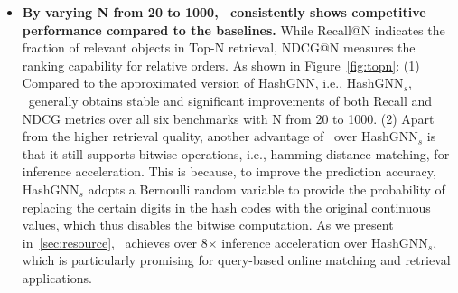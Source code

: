 \begin{itemize}[leftmargin=*]
\item \textbf{By varying N from 20 to 1000, \model~consistently shows competitive performance compared to the baselines.}
While Recall@N indicates the fraction of relevant objects in Top-N retrieval, NDCG@N measures the ranking capability for relative orders.
As shown in Figure~\ref{fig:topn}:
(1) Compared to the approximated version of HashGNN, i.e., HashGNN$_{s}$, \model~generally obtains stable and significant improvements of both Recall and NDCG metrics over all six benchmarks with N from 20 to 1000.
(2) Apart from the higher retrieval quality, another advantage of \model~over HashGNN$_{s}$ is that it still supports bitwise operations, i.e., hamming distance matching, for inference acceleration. 
This is because, to improve the prediction accuracy, HashGNN$_{s}$ adopts a Bernoulli random variable to provide the probability of replacing the certain digits in the hash codes with the original continuous values, which thus disables the bitwise computation.
As we present in~\cref{sec:resource}, \model~achieves over 8$\times$ inference acceleration over HashGNN$_{s}$, which is particularly promising for query-based online matching and retrieval applications.
\end{itemize}

